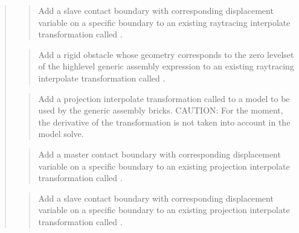 \documentclass[a4paper,11pt,english]{sphinxmanual}
\begin{document}
\begin{quote}
\begin{quote}
Add a slave contact boundary with corresponding displacement variable
 on a specific boundary  to an existing raytracing
interpolate transformation called .
\end{quote}

\begin{quote}

Add a rigid obstacle whose geometry corresponds to the zero level\sphinxhyphen{}set
of the high\sphinxhyphen{}level generic assembly expression 
to an existing raytracing interpolate transformation called .
\end{quote}

\begin{quote}

Add a projection interpolate transformation called  to a model
to be used by the generic assembly bricks.
CAUTION: For the moment, the derivative of the
transformation is not taken into account in the model solve.
\end{quote}

\begin{quote}

Add a master contact boundary with corresponding displacement variable
 on a specific boundary  to an existing projection
interpolate transformation called .
\end{quote}

\begin{quote}

Add a slave contact boundary with corresponding displacement variable
 on a specific boundary  to an existing projection
interpolate transformation called .
\end{quote}


\end{quote}
\end{document}
